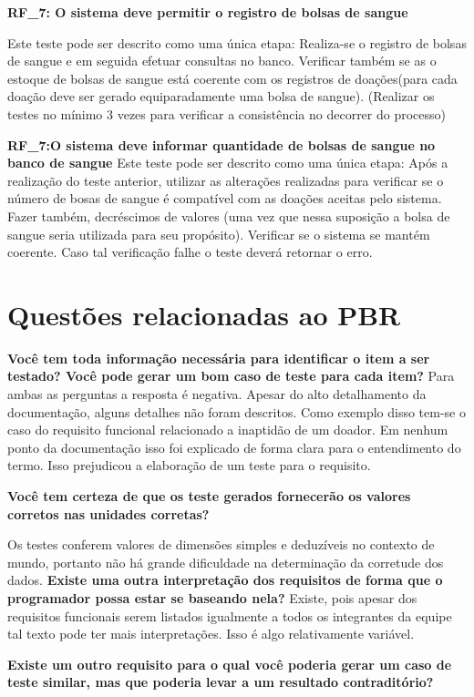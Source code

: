 \documentclass[12pt,a4paper]{report}
\begin{document}
\textbf{RF\_7: O sistema deve permitir o registro de bolsas de sangue}

Este teste pode ser descrito como uma  única etapa: Realiza-se o registro de bolsas de sangue e em seguida efetuar consultas no banco. Verificar também se as o estoque de bolsas de sangue está coerente com os registros de doações(para cada doação deve ser gerado equiparadamente uma bolsa de sangue). (Realizar os testes no mínimo 3 vezes para verificar a consistência no decorrer do processo)


\textbf{RF\_7:O sistema deve informar quantidade de bolsas de sangue no banco de sangue}
Este teste pode ser descrito como uma única etapa: Após a realização do teste anterior, utilizar as alterações realizadas para verificar se o número de bosas de sangue é compatível com as doações aceitas pelo sistema. Fazer também, decréscimos de valores (uma vez que nessa suposição a bolsa de sangue seria utilizada para seu propósito). Verificar se o sistema se mantém coerente. Caso tal verificação falhe o teste deverá retornar o erro.

\section{Questões relacionadas ao PBR}
\textbf{Você tem toda informação necessária para identificar o item a ser testado? Você pode gerar um bom caso de teste para cada item?}
Para ambas as perguntas a resposta é negativa. Apesar do alto detalhamento da documentação, alguns detalhes não foram descritos. Como exemplo disso tem-se o caso do requisito funcional relacionado a inaptidão de um doador. Em nenhum ponto da documentação isso foi explicado de forma clara para o entendimento do termo. Isso prejudicou a elaboração de um teste para o requisito.

\textbf{Você tem certeza de que os teste gerados fornecerão os valores corretos nas unidades corretas?}

Os testes conferem valores de dimensões simples e deduzíveis no contexto de mundo, portanto não há grande dificuldade na determinação da corretude dos dados.
\textbf{Existe uma outra interpretação dos requisitos de forma que o programador possa estar se baseando nela?}
Existe, pois apesar dos requisitos funcionais serem listados igualmente a todos os integrantes da equipe tal texto pode ter mais interpretações. Isso é algo relativamente variável.

\textbf{Existe um outro requisito para o qual você poderia gerar um caso de teste similar, mas que poderia levar a um resultado contraditório?}
\end{document}
